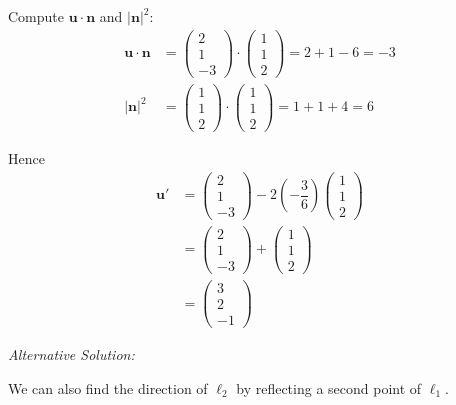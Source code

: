 \documentclass[leqno]{article}
\begin{document}
\begin{enumerate}[
  label=\textbf{\arabic*.},
  leftmargin=*,
  topsep=0pt,
  partopsep=0pt,
  parsep=0pt
]
\begin{djsSolution}
Compute \(\mathbf u\cdot\mathbf n\) and \(|\mathbf n|^2\):
\begin{align*}
\mathbf u\cdot \mathbf n&=
\begin{pmatrix}2\\1\\-3\end{pmatrix}\cdot
\begin{pmatrix}1\\1\\2\end{pmatrix}
=2+1-6=-3\\
|\mathbf n|^2&=
\begin{pmatrix}1\\1\\2\end{pmatrix}\cdot
\begin{pmatrix}1\\1\\2\end{pmatrix}
=1+1+4=6
\end{align*}

Hence
\begin{align*}
\mathbf u'
&=
\begin{pmatrix}2\\1\\-3\end{pmatrix}
-2\left(-\dfrac{3}{6}\right)
\begin{pmatrix}1\\1\\2\end{pmatrix}\\
&=
\begin{pmatrix}2\\1\\-3\end{pmatrix}
+\begin{pmatrix}1\\1\\2\end{pmatrix}\\
&=
\begin{pmatrix}3\\2\\-1\end{pmatrix}
\end{align*}

{\setlength{\parskip}{8pt}%
\textit{Alternative Solution:}

We can also find the direction of \(\ell_2\) by reflecting a second point of \(\ell_1\).

}
\end{djsSolution}
\end{enumerate}
\end{document}

